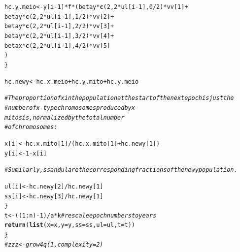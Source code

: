 \documentclass{article}\usepackage[]{graphicx}\usepackage[]{color}
\makeatletter
\newcommand{\hlnum}[1]{\textcolor[rgb]{0.686,0.059,0.569}{#1}}%
\newcommand{\hlcom}[1]{\textcolor[rgb]{0.678,0.584,0.686}{\textit{#1}}}%
\newcommand{\hlopt}[1]{\textcolor[rgb]{0,0,0}{#1}}%
\newcommand{\hlstd}[1]{\textcolor[rgb]{0.345,0.345,0.345}{#1}}%
\newcommand{\hlkwb}[1]{\textcolor[rgb]{0.69,0.353,0.396}{#1}}%
\newcommand{\hlkwc}[1]{\textcolor[rgb]{0.333,0.667,0.333}{#1}}%
\newcommand{\hlkwd}[1]{\textcolor[rgb]{0.737,0.353,0.396}{\textbf{#1}}}%
\newenvironment{kframe}{%
 \def\at@end@of@kframe{}%
 \ifinner\ifhmode%
  \def\at@end@of@kframe{\end{minipage}}%
  \begin{minipage}{\columnwidth}%
 \fi\fi%
 \def\FrameCommand##1{\hskip\@totalleftmargin \hskip-\fboxsep
 \colorbox{shadecolor}{##1}\hskip-\fboxsep
     \hskip-\linewidth \hskip-\@totalleftmargin \hskip\columnwidth}%
 \MakeFramed {\advance\hsize-\width
   \@totalleftmargin\z@ \linewidth\hsize
   \@setminipage}}%
 {\par\unskip\endMakeFramed%
 \at@end@of@kframe}
\newenvironment{knitrout}{}{} %
\makeatother
\begin{document}
\begin{knitrout}
\begin{kframe}
\begin{alltt}
      \hlstd{hc.y.meio} \hlkwb{<-} \hlstd{y[i}\hlopt{-}\hlnum{1}\hlstd{]} \hlopt{*}   \hlstd{f} \hlopt{*} \hlstd{(    betay} \hlopt{*} \hlkwd{c}\hlstd{(}\hlnum{2}\hlstd{,} \hlnum{2}\hlopt{*}\hlstd{ul[i}\hlopt{-}\hlnum{1}\hlstd{],} \hlnum{0}\hlopt{/}\hlnum{2}\hlstd{)} \hlopt{*} \hlstd{vv[}\hlnum{1}\hlstd{]} \hlopt{+}
                                       \hlstd{betay} \hlopt{*} \hlkwd{c}\hlstd{(}\hlnum{2}\hlstd{,} \hlnum{2}\hlopt{*}\hlstd{ul[i}\hlopt{-}\hlnum{1}\hlstd{],} \hlnum{1}\hlopt{/}\hlnum{2}\hlstd{)} \hlopt{*} \hlstd{vv[}\hlnum{2}\hlstd{]} \hlopt{+}
                                       \hlstd{betay} \hlopt{*} \hlkwd{c}\hlstd{(}\hlnum{2}\hlstd{,} \hlnum{2}\hlopt{*}\hlstd{ul[i}\hlopt{-}\hlnum{1}\hlstd{],} \hlnum{2}\hlopt{/}\hlnum{2}\hlstd{)} \hlopt{*} \hlstd{vv[}\hlnum{3}\hlstd{]} \hlopt{+}
                                       \hlstd{betay} \hlopt{*} \hlkwd{c}\hlstd{(}\hlnum{2}\hlstd{,} \hlnum{2}\hlopt{*}\hlstd{ul[i}\hlopt{-}\hlnum{1}\hlstd{],} \hlnum{3}\hlopt{/}\hlnum{2}\hlstd{)} \hlopt{*} \hlstd{vv[}\hlnum{4}\hlstd{]} \hlopt{+}
                                       \hlstd{betax} \hlopt{*} \hlkwd{c}\hlstd{(}\hlnum{2}\hlstd{,} \hlnum{2}\hlopt{*}\hlstd{ul[i}\hlopt{-}\hlnum{1}\hlstd{],} \hlnum{4}\hlopt{/}\hlnum{2}\hlstd{)} \hlopt{*} \hlstd{vv[}\hlnum{5}\hlstd{]}
                                  \hlstd{)}
    \hlstd{\}}

    \hlstd{hc.newy} \hlkwb{<-} \hlstd{hc.x.meio} \hlopt{+} \hlstd{hc.y.mito} \hlopt{+} \hlstd{hc.y.meio}

    \hlcom{# The proportion of x in the population at the start of the next epoch is just the }
    \hlcom{# number of x-type chromosomes produced by x-mitosis, normalized by the total number}
    \hlcom{# of chromosomes:}

    \hlstd{x[i]} \hlkwb{<-} \hlstd{hc.x.mito[}\hlnum{1}\hlstd{]}\hlopt{/}\hlstd{(hc.x.mito[}\hlnum{1}\hlstd{]} \hlopt{+} \hlstd{hc.newy[}\hlnum{1}\hlstd{])}
    \hlstd{y[i]} \hlkwb{<-} \hlnum{1} \hlopt{-} \hlstd{x[i]}

    \hlcom{# Sumilarly, ss and ul are the corresponding fractions of the new y population.}

    \hlstd{ul[i]} \hlkwb{<-} \hlstd{hc.newy[}\hlnum{2}\hlstd{]}\hlopt{/}\hlstd{hc.newy[}\hlnum{1}\hlstd{]}
    \hlstd{ss[i]} \hlkwb{<-} \hlstd{hc.newy[}\hlnum{3}\hlstd{]}\hlopt{/}\hlstd{hc.newy[}\hlnum{1}\hlstd{]}
  \hlstd{\}}
  \hlstd{t} \hlkwb{<-} \hlstd{((}\hlnum{1}\hlopt{:}\hlstd{n)}\hlopt{-}\hlnum{1}\hlstd{)}\hlopt{/}\hlstd{a}\hlopt{*}\hlstd{k}  \hlcom{# rescale epoch numbers to years}
  \hlkwd{return}\hlstd{(}\hlkwd{list}\hlstd{(}\hlkwc{x}\hlstd{=x,} \hlkwc{y}\hlstd{=y,} \hlkwc{ss}\hlstd{=ss,} \hlkwc{ul}\hlstd{=ul,} \hlkwc{t}\hlstd{=t))}
\hlstd{\}}
\hlcom{#zzz<-grow4q(1,complexity=2)}
\end{alltt}
\end{kframe}
\end{knitrout}
\end{document}
